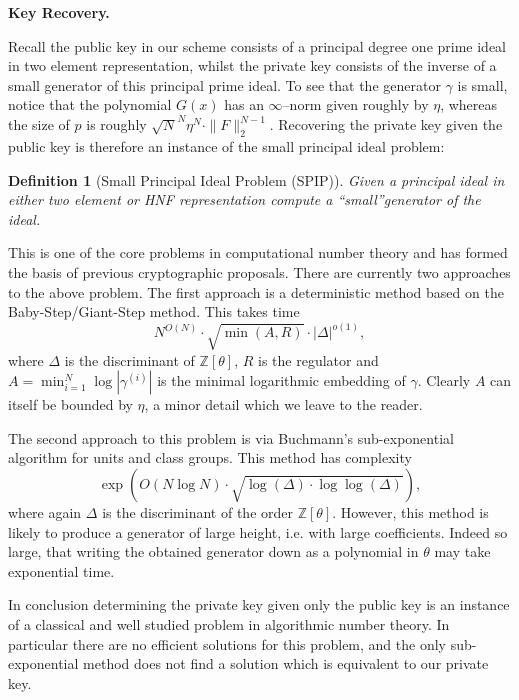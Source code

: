\documentclass[a4paper, 12pt]{article}
\newtheorem{definition}{Definition}
\newcommand{\ndash}{\nobreakdash --}
\newcommand{\bb}[1]{\mathbb{#1}}
\newcommand{\tfr}[1]{\textfrak{#1}}
\newcommand{\tbf}[1]{\textbf{#1}}
\newenvironment{bparagraph}[1]{
	\vspace{2ex}\noindent\tbf{#1. }\nolinebreak 
}{}
\begin{document}
	\begin{bparagraph}{Key Recovery}
		Recall the public key in our scheme consists of a principal degree one prime ideal in two element representation, whilst the private key consists of the inverse of a small generator of this principal prime ideal. 
		To see that the generator $\gamma$ is small, notice that the polynomial $G(x)$ has an $\infty$\ndash norm given roughly by $\eta$, whereas the size of $p$ is roughly $\sqrt{N}^N \eta ^ N \cdot \| F \|^{N-1}_2$. 
		Recovering the private key given the public key is therefore an instance of the small principal ideal problem:
		
		\begin{definition}[Small Principal Ideal Problem (SPIP)]
			Given a principal ideal \tfr{a} in either two element or HNF representation compute a \textquotedblleft small\textquotedblright generator of the ideal.
		\end{definition}
		
		This is one of the core problems in computational number theory and has formed the basis of previous cryptographic proposals. There are currently two approaches to the above problem.
		The first approach is a deterministic method based on the Baby-Step/Giant-Step method.
		This takes time
		\[
			N^{O(N)} \cdot \sqrt{\min{(A, R)}} \cdot |\Delta|^{o(1)},
		\]
		where $\Delta$ is the discriminant of $\bb{Z}[\theta]$, $R$ is the regulator and $A = \min^{N}_{i=1} \log{| \gamma^{(i)} |}$ is the minimal logarithmic embedding of $\gamma$. 
		Clearly $A$ can itself be bounded by $\eta$, a minor detail which we leave to the reader.
		
		The second approach to this problem is via Buchmann's sub-exponential algorithm for units and class groups.
		This method has complexity
		\[
			\exp{\left( O(N \log N) \cdot \sqrt{\log{(\Delta)} \cdot \log{\log{(\Delta)}}} \right)},
		\]
		where again $\Delta$ is the discriminant of the order $\bb{Z}[\theta]$.
		However, this method is	likely to produce a generator of large height, i.e. with large coefficients.
		Indeed so large, that writing the obtained generator down as a polynomial in $\theta$ may take exponential time.
		
		In conclusion determining the private key given only the public key is an instance of a classical and well studied problem in algorithmic number theory.
		In particular there are no efficient solutions for this problem, and the only sub-exponential method does not find a solution which is equivalent to our private key.
		
	\end{bparagraph}
	
\end{document}

